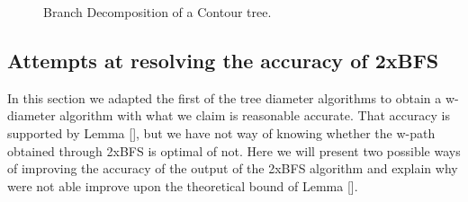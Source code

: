 \begin{figure}
    \qquad
    \caption{Branch Decomposition of a Contour tree.}%
    \label{fig:path-cases}%
\end{figure}



\subsection{Attempts at resolving the accuracy of 2xBFS}




In this section we adapted the first of the tree diameter algorithms to obtain a w-diameter algorithm with what we claim is reasonable accurate. That accuracy is supported by Lemma [], but we have not way of knowing whether the w-path obtained through 2xBFS is optimal of not. Here we will present two possible ways of improving the accuracy of the output of the 2xBFS algorithm and explain why were not able improve upon the theoretical bound of Lemma [].

